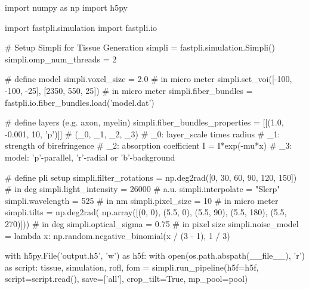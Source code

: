 import numpy as np
import h5py

import fastpli.simulation
import fastpli.io

# Setup Simpli for Tissue Generation
simpli = fastpli.simulation.Simpli()
simpli.omp_num_threads = 2

# define model
simpli.voxel_size = 2.0  # in micro meter
simpli.set_voi([-100, -100, -25], [2350, 550, 25])  # in micro meter
simpli.fiber_bundles = fastpli.io.fiber_bundles.load('model.dat')

# define layers (e.g. axon, myelin)
simpli.fiber_bundles_properties = [[(1.0, -0.001, 10, 'p')]]
# (_0, _1, _2, _3)
# _0: layer_scale times radius
# _1: strength of birefringence
# _2: absorption coefficient I = I*exp(-mu*x)
# _3: model: 'p'-parallel, 'r'-radial or 'b'-background

# define pli setup
simpli.filter_rotations = np.deg2rad([0, 30, 60, 90, 120, 150])  # in deg
simpli.light_intensity = 26000  # a.u.
simpli.interpolate = "Slerp"
simpli.wavelength = 525  # in nm
simpli.pixel_size = 10  # in micro meter
simpli.tilts = np.deg2rad(
    np.array([(0, 0), (5.5, 0), (5.5, 90),
              (5.5, 180), (5.5, 270)]))  # in deg
simpli.optical_sigma = 0.75  # in pixel size
simpli.noise_model = 
    lambda x: np.random.negative_binomial(x / (3 - 1), 1 / 3)

with h5py.File('output.h5', 'w') as h5f:
    with open(os.path.abspath(__file__), 'r') as script:
        tissue, simulation, rofl, fom = simpli.run_pipeline(h5f=h5f,
                                               script=script.read(),
                                               save=['all'],
                                               crop_tilt=True,
                                               mp_pool=pool)